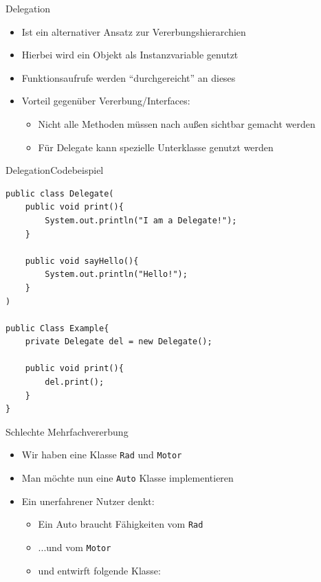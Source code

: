 \begin{frame}{Delegation}
    \begin{itemize}
        \item Ist ein alternativer Ansatz zur Vererbungshierarchien
        \item Hierbei wird ein Objekt als Instanzvariable genutzt
        \item Funktionsaufrufe werden "`durchgereicht"' an dieses
        \item Vorteil gegenüber Vererbung/Interfaces:
        \begin{itemize}
            \item Nicht alle Methoden müssen nach außen sichtbar gemacht werden
            \item Für Delegate kann spezielle Unterklasse genutzt werden
        \end{itemize}
    \end{itemize}
\end{frame}

\begin{frame}[fragile]{Delegation}{Codebeispiel}
\lstset{style=java}
\begin{lstlisting}
public class Delegate(
    public void print(){
        System.out.println("I am a Delegate!");
    }
    
    public void sayHello(){
        System.out.println("Hello!");
    }
)

public Class Example{
    private Delegate del = new Delegate();
    
    public void print(){
        del.print();
    }
}
\end{lstlisting}
\end{frame}

\begin{frame}{Schlechte Mehrfachvererbung}
    \begin{itemize}
        \item Wir haben eine Klasse \texttt{Rad} und \texttt{Motor}
        \item Man möchte nun eine \texttt{Auto} Klasse implementieren
        \item Ein unerfahrener Nutzer denkt:
        \begin{itemize}
            \item Ein Auto braucht Fähigkeiten vom \texttt{Rad}
            \item ...und vom \texttt{Motor}
            \item und entwirft folgende Klasse:
        \end{itemize}
    \end{itemize}
\end{frame}


